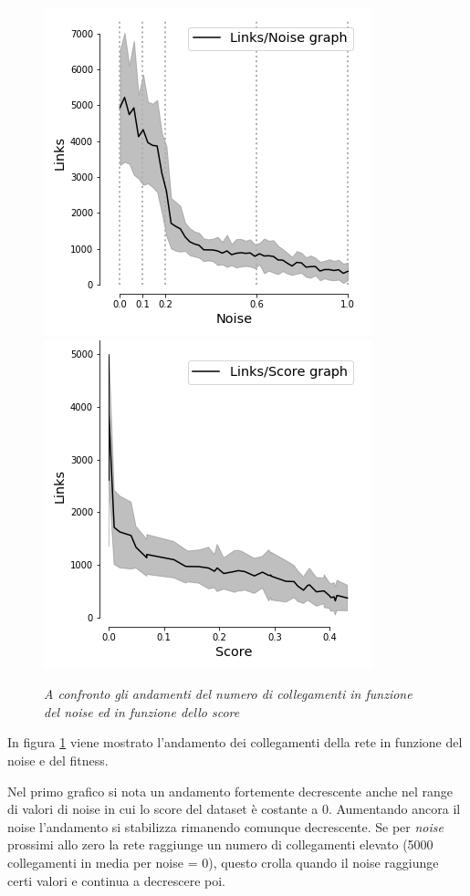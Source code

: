 \documentclass[12pt,a4paper]{report}
\begin{document}
\begin{figure}[H]
 \centering
 \includegraphics[scale = 0.5]{images/links_noise_moons}
 \includegraphics[scale = 0.5]{images/Links_Score_moons}
 \caption{\textit{A confronto gli andamenti del numero di collegamenti in funzione del noise ed in funzione dello score}}
 \label{linksmoons}
\end{figure}

In figura \ref{linksmoons} viene mostrato l'andamento dei collegamenti della rete in funzione del noise e del fitness.

Nel primo grafico si nota un andamento fortemente decrescente anche nel range di valori di noise in cui lo score del dataset è costante a 0. Aumentando ancora il noise l'andamento si stabilizza rimanendo comunque decrescente. Se per \textit{noise} prossimi allo zero la rete raggiunge un numero di collegamenti elevato (5000 collegamenti in media per noise = 0), questo crolla quando il noise raggiunge certi valori e continua a decrescere poi.
\end{document}
